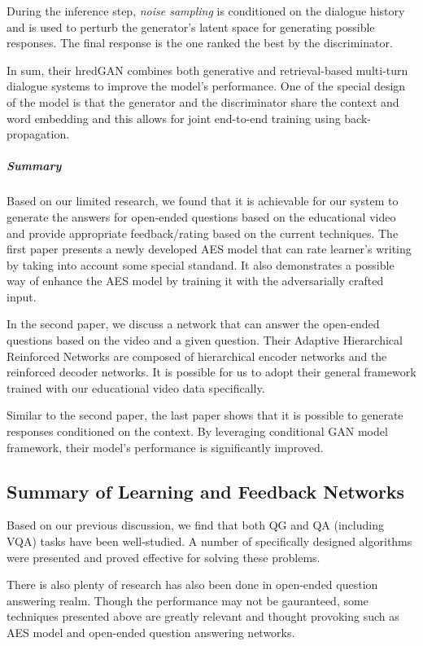 \documentclass{acm_proc_article-sp}
\begin{document}
During the inference step, \emph{noise sampling} is conditioned on the
dialogue history and is used to perturb the generator's latent space for
generating possible responses. The final response is the one ranked the
best by the discriminator.

In sum, their hredGAN combines both generative and retrieval-based
multi-turn dialogue systems to improve the model's performance. One of
the special design of the model is that the generator and the
discriminator share the context and word embedding and this allows for
joint end-to-end training using back-propagation.

\subparagraph{Summary}\label{summary-3}

Based on our limited research, we found that it is achievable for our
system to generate the answers for open-ended questions based on the
educational video and provide appropriate feedback/rating based on the
current techniques. The first paper presents a newly developed AES model
that can rate learner's writing by taking into account some special
standand. It also demonstrates a possible way of enhance the AES model
by training it with the adversarially crafted input.

In the second paper, we discuss a network that can answer the open-ended
questions based on the video and a given question. Their Adaptive
Hierarchical Reinforced Networks are composed of hierarchical encoder
networks and the reinforced decoder networks. It is possible for us to
adopt their general framework trained with our educational video data
specifically.

Similar to the second paper, the last paper shows that it is possible to
generate responses conditioned on the context. By leveraging conditional
GAN model framework, their model's performance is significantly
improved.

\subsection{Summary of Learning and Feedback
Networks}\label{summary-of-learning-and-feedback-networks}

Based on our previous discussion, we find that both QG and QA (including
VQA) tasks have been well-studied. A number of specifically designed
algorithms were presented and proved effective for solving these
problems.

There is also plenty of research has also been done in open-ended
question answering realm. Though the performance may not be gauranteed,
some techniques presented above are greatly relevant and thought
provoking such as AES model and open-ended question answering networks.
\end{document}
